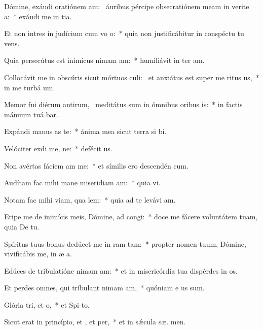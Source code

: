 \item Dómine, exáudi oratiónem am:~\pscross{} áuribus pércipe obsecratiónem meam in verite a:~* exáudi me in  tia.
\item Et non intres in judícium cum vo o:~* quia non justificábitur in conspéctu tu  vens.
\item Quia persecútus est inimícus nimam am:~* humiliávit in ter  am.
\item Collocávit me in obscúris sicut mórtuos culi:~\pscross{} et anxiátus est super me ritus us,~* in me turbá   um.
\item Memor fui diérum antirum,~\pscross{} meditátus sum in ómnibus oribus is:~* in factis mánuum tuá bar.
\item Expándi manus as  te:~* ánima mea sicut terra si  bi.
\item Velóciter exdi me, ne:~* defécit  us.
\item Non avértas fáciem am  me:~* et símilis ero descendén  cum.
\item Audítam fac mihi mane miseridiam am:~* quia   vi.
\item Notam fac mihi viam,  qua lem:~* quia ad te levávi  am.
\item Eripe me de inimícis meis, Dómine, ad  congi:~* doce me fácere voluntátem tuam, quia De   tu.
\item Spíritus tuus bonus dedúcet me in ram tam:~* propter nomen tuum, Dómine, vivificábis me, in æ a.
\item Edúces de tribulatióne nimam am:~* et in misericórdia tua dispérdes in os.
\item Et perdes omnes, qui tríbulant nimam am,~* quóniam e  us sum.
\item Glória tri, et o,~* et Spi to.
\item Sicut erat in princípio, et , et per,~* et in sǽcula sæ. men.
